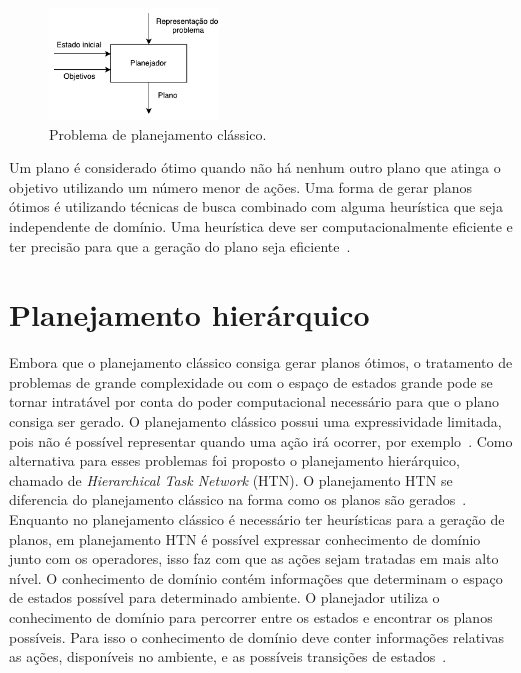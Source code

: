 \begin{figure}[ht]
	\centering
	\includegraphics[width=0.4\textwidth]{fig/modelo.pdf}
	\caption{Problema de planejamento clássico.}
	\label{fig:planmodelo}
\end{figure} 

Um plano é considerado ótimo quando não há nenhum outro plano que atinga o objetivo utilizando um número menor de ações.
Uma forma de gerar planos ótimos é utilizando técnicas de busca combinado com alguma heurística que seja independente de domínio.
Uma heurística deve ser computacionalmente eficiente e ter precisão para que a geração do plano seja eficiente~\cite{helmert2007flexible}.

\section{Planejamento hierárquico} 

Embora que o planejamento clássico consiga gerar planos ótimos, o tratamento de problemas de grande complexidade ou com o espaço de estados grande pode se tornar intratável por conta do poder computacional necessário para que o plano consiga ser gerado.
O planejamento clássico possui uma expressividade limitada, pois não é possível representar quando uma ação irá ocorrer, por exemplo~\cite[Capítulo 11]{intelligence2003modern}.
Como alternativa para esses problemas foi proposto o planejamento hierárquico, chamado de \textit{Hierarchical Task Network} (HTN). 
O planejamento HTN se diferencia do planejamento clássico na forma como os planos são gerados~\cite{ghallab2004automated}. 
Enquanto no planejamento clássico é necessário ter heurísticas para a geração de planos, em planejamento HTN é possível expressar conhecimento de domínio junto com os operadores, isso faz com que as ações sejam tratadas em mais alto nível.  
O conhecimento de domínio contém informações que determinam o espaço de estados possível para determinado ambiente. O planejador utiliza o conhecimento de domínio para percorrer entre os estados e encontrar os planos possíveis. Para isso o conhecimento de domínio deve conter informações relativas as ações, disponíveis no ambiente, e as possíveis transições de estados~\cite[Capítulo 11]{intelligence2003modern}.

